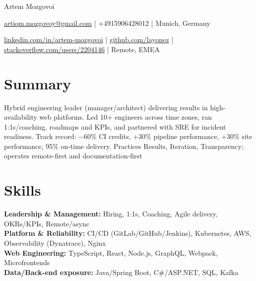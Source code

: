 \documentclass[11pt]{article}       %
\begin{document}
\centerline{\Huge Artem Mozgovoi}

\vspace{5pt}

\centerline{\href{mailto:artiom.mozgovoy@gmail.com}{artiom.mozgovoy@gmail.com} | +4915906428012 | Munich, Germany}
\centerline{\href{https://www.linkedin.com/in/artem-mozgovoi}{linkedin.com/in/artem-mozgovoi} | \href{https://github.com/layonez}{github.com/layonez} | \href{https://stackoverflow.com/users/2204146/layonez}{stackoverflow.com/users/2204146} | Remote, EMEA}

\vspace{-10pt}

\section*{Summary}
Hybrid engineering leader (manager/architect) delivering results in high-availability web platforms. Led 10+ engineers across time zones, ran 1:1s/coaching, roadmaps and KPIs, and partnered with SRE for incident readiness. Track record: $-$60\% CI credits, +30\% pipeline performance, +30\% site performance, 95\% on-time delivery. Practices Results, Iteration, Transparency; operates remote-first and documentation-first

\section*{Skills}
\textbf{Leadership \& Management:} Hiring, 1:1s, Coaching, Agile delivery, OKRs/KPIs, Remote/async \\
\textbf{Platform \& Reliability:} CI/CD (GitLab/GitHub/Jenkins), Kubernetes, AWS, Observability (Dynatrace), Nginx \\
\textbf{Web Engineering:} TypeScript, React, Node.js, GraphQL, Webpack, Microfrontends \\
\textbf{Data/Back-end exposure:} Java/Spring Boot, C\#/ASP.NET, SQL, Kafka

\vspace{-6.5pt}

\end{document}
